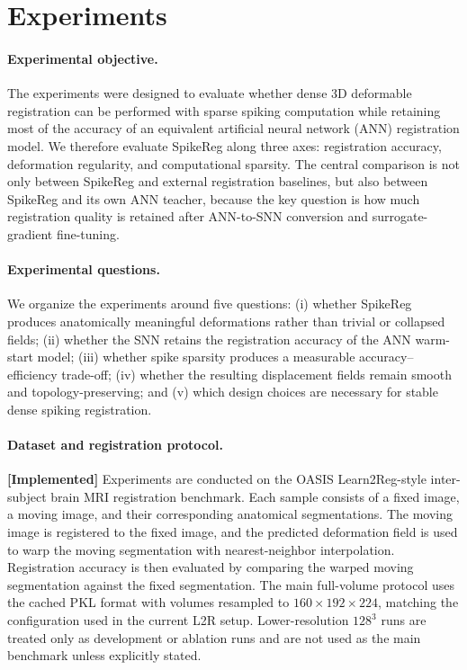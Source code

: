 \section{Experiments}
\label{sec:experiments}

\paragraph{Experimental objective.}
The experiments were designed to evaluate whether dense 3D deformable registration can be performed with sparse spiking computation while retaining most of the accuracy of an equivalent artificial neural network (ANN) registration model. We therefore evaluate SpikeReg along three axes: registration accuracy, deformation regularity, and computational sparsity. The central comparison is not only between SpikeReg and external registration baselines, but also between SpikeReg and its own ANN teacher, because the key question is how much registration quality is retained after ANN-to-SNN conversion and surrogate-gradient fine-tuning.

\paragraph{Experimental questions.}
We organize the experiments around five questions:
(i) whether SpikeReg produces anatomically meaningful deformations rather than trivial or collapsed fields;
(ii) whether the SNN retains the registration accuracy of the ANN warm-start model;
(iii) whether spike sparsity produces a measurable accuracy--efficiency trade-off;
(iv) whether the resulting displacement fields remain smooth and topology-preserving;
and (v) which design choices are necessary for stable dense spiking registration.

\paragraph{Dataset and registration protocol.}
\textbf{[Implemented]} Experiments are conducted on the OASIS Learn2Reg-style inter-subject brain MRI registration benchmark. Each sample consists of a fixed image, a moving image, and their corresponding anatomical segmentations. The moving image is registered to the fixed image, and the predicted deformation field is used to warp the moving segmentation with nearest-neighbor interpolation. Registration accuracy is then evaluated by comparing the warped moving segmentation against the fixed segmentation. The main full-volume protocol uses the cached PKL format with volumes resampled to \(160 \times 192 \times 224\), matching the configuration used in the current L2R setup. Lower-resolution \(128^3\) runs are treated only as development or ablation runs and are not used as the main benchmark unless explicitly stated.

